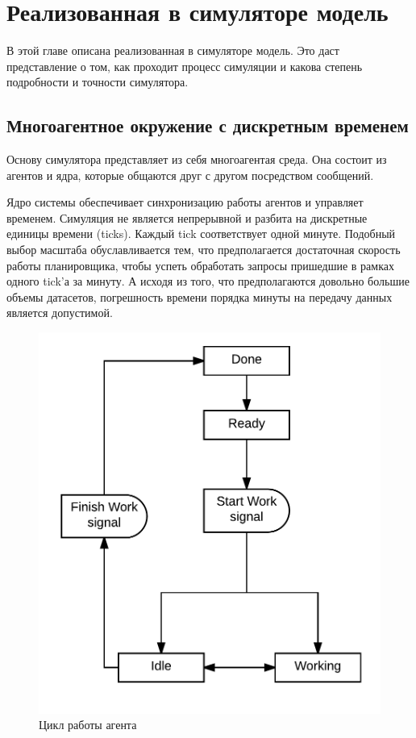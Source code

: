\chapter{Реализованная в симуляторе модель}

В этой главе описана реализованная в симуляторе модель. Это даст представление о том, как проходит процесс симуляции и какова степень подробности и точности симулятора.

\section{Многоагентное окружение с дискретным временем}

Основу симулятора представляет из себя многоагентая среда. Она состоит из агентов и ядра, которые общаются друг с другом посредством сообщений.

Ядро системы обеспечивает синхронизацию работы агентов и управляет временем. Симуляция не является непрерывной и разбита на дискретные единицы времени (ticks). Каждый tick соответствует одной минуте. Подобный выбор масштаба обуславливается тем, что предполагается достаточная скорость работы планировщика, чтобы успеть обработать запросы пришедшие в рамках одного tick'а за минуту. А исходя из того, что предполагаются довольно большие объемы датасетов, погрешность времени порядка минуты на передачу данных является допустимой.

\begin{figure}
	\centering
	\includegraphics{fig/agent_workflow}
	\caption{Цикл работы агента}\label{fig:agent_workflow}
\end{figure}

